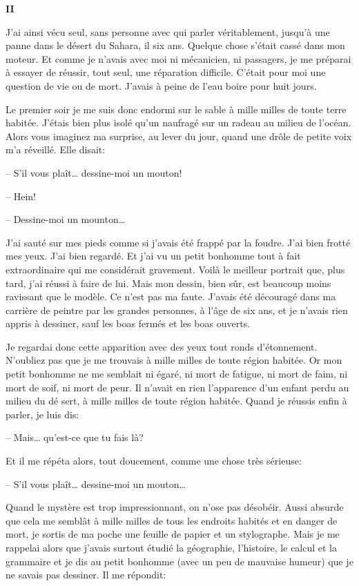 \begin{Parallel}[p]{}{}
{\textbf{II}

J'ai ainsi vécu seul, sans personne avec qui parler
véritablement, jusqu’à une panne dans le désert du
Sahara, il six ans. Quelque chose s'était cassé
dans mon moteur. Et comme je n'avais avec moi ni
mécanicien, ni passagers, je me préparai à essayer
de réussir, tout seul, une réparation difficile. C'était
pour moi une question de vie ou de mort. J'avais à
peine de l'eau boire pour huit jours.

Le premier soir je me suis donc endormi sur le
sable à mille milles de toute terre habitée. J'étais
bien plus isolé qu'un naufragé sur un radeau au
milieu de l'océan. Alors vous imaginez ma surprise,
au lever du jour, quand une drôle de petite voix m'a
réveillé. Elle disait:

-- S'il vous plaît\ldots{} dessine-moi un mouton!

-- Hein!

-- Dessine-moi un mounton\ldots{}

J'ai sauté sur mes pieds comme si j'avais été
frappé par la foudre. J'ai bien frotté mes yeux. J'ai bien regardé. Et j'ai vu un petit bonhomme tout à
fait extraordinaire qui me considérait gravement.
Voilà le meilleur portrait que, plus tard, j'ai réussi à
faire de lui. Mais mon dessin, bien sûr, est beaucoup
moins ravissant que le modèle. Ce n'est pas ma
faute. J'avais été découragé dans ma carrière de
peintre par les grandes personnes, à l'âge de six ans,
et je n'avais rien appris à dessiner, sauf les boas fermés et les boas ouverts.

Je regardai donc cette apparition avec des yeux
tout ronds d'étonnement. N'oubliez pas que je me
trouvais à mille milles de toute région habitée. Or
mon petit bonhomme ne me semblait ni égaré, ni
mort de fatigue, ni mort de faim, ni mort de soif, ni
mort de peur. Il n'avait en rien l'apparence d’un
enfant perdu au milieu du dé sert, à mille milles de
toute région habitée. Quand je réussis enfin à parler, je luis dis:

-- Mais\ldots{} qu'est-ce que tu fais là?

Et il me répéta alors, tout doucement, comme
une chose très sérieuse:

-- S'il vous plaît\ldots{} dessine-moi un mouton\ldots{}

Quand le mystère est trop impressionnant, on
n'ose pas désobéir. Aussi absurde que cela me semblât à mille milles de tous les endroits habités et en
danger de mort, je sortis de ma poche une feuille de
papier et un stylographe. Mais je me rappelai alors
que j'avais surtout étudié la géographie, l'histoire, le
calcul et la grammaire et je dis au petit bonhomme
(avec un peu de mauvaise humeur) que je ne savais
pas dessiner. Il me répondit:

}
\end{Parallel}
